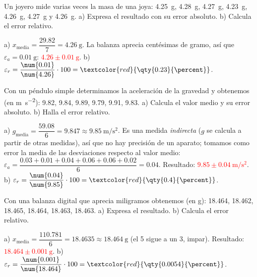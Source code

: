 \begin{exercise}
    Un joyero mide varias veces la masa de una joya: \qty{4.25}{\gram}, \qty{4.28}{\gram}, \qty{4.27}{\gram}, \qty{4.23}{\gram}, \qty{4.26}{\gram}, \qty{4.27}{\gram} y \qty{4.26}{\gram}. a) Expresa el resultado con su error absoluto. b) Calcula el error relativo.
    \begin{solu}
        a) \(x_\text{media} = \dfrac{\num{29.82}}{7} = \qty{4.26}{\gram}\). La balanza aprecia centésimas de gramo, así que \(\varepsilon_a = \qty{0.01}{\gram}\): \textcolor{red}{\(\num{4.26} \pm \qty{0.01}{\gram}\)}.
        b) \(\varepsilon_r = \dfrac{\num{0.01}}{\num{4.26}} \cdot 100 = \textcolor{red}{\qty{0.23}{\percent}}\).
    \end{solu}
\end{exercise}

\begin{exercise}
    Con un péndulo simple determinamos la aceleración de la gravedad y obtenemos (en \unit{\m\per\square\s}): \num{9.82}, \num{9.84}, \num{9.89}, \num{9.79}, \num{9.91}, \num{9.83}. a) Calcula el valor medio y su error absoluto. b) Halla el error relativo.
    \begin{solu}
        a) \(g_\text{media} = \dfrac{\num{59.08}}{6} = \num{9.847} \approx \qty{9.85}{\m\per\square\s}\). Es una medida \emph{indirecta} (\(g\) se calcula a partir de otras medidas), así que no hay precisión de un aparato; tomamos como error la media de las desviaciones respecto al valor medio:
        \(\varepsilon_a = \dfrac{\num{0.03} + \num{0.01} + \num{0.04} + \num{0.06} + \num{0.06} + \num{0.02}}{6} = \num{0.04}\). Resultado: \textcolor{red}{\(\num{9.85} \pm \qty{0.04}{\m\per\square\s}\)}.
        b) \(\varepsilon_r = \dfrac{\num{0.04}}{\num{9.85}} \cdot 100 = \textcolor{red}{\qty{0.4}{\percent}}\).
    \end{solu}
\end{exercise}

\begin{exercise}
    Con una balanza digital que aprecia miligramos obtenemos (en g): \num{18.464}, \num{18.462}, \num{18.465}, \num{18.464}, \num{18.463}, \num{18.463}. a) Expresa el resultado. b) Calcula el error relativo.
    \begin{solu}
        a) \(x_\text{media} = \dfrac{\num{110.781}}{6} = \num{18.4635} \approx \qty{18.464}{\gram}\) (el 5 sigue a un 3, impar). Resultado: \textcolor{red}{\(\num{18.464} \pm \qty{0.001}{\gram}\)}.
        b) \(\varepsilon_r = \dfrac{\num{0.001}}{\num{18.464}} \cdot 100 = \textcolor{red}{\qty{0.0054}{\percent}}\).
    \end{solu}
\end{exercise}

